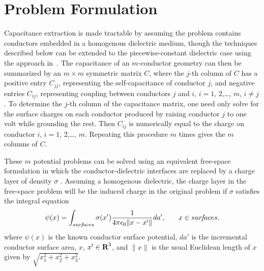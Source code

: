 \section{Problem Formulation}
\label{form}

Capacitance extraction is made tractable by assuming the problem
contains conductors embedded in a homogenous dielectric medium, though
the techniques described below can be extended to the
piecewise-constant dielectric case using the approach in~\cite{rao84}.
The capacitance of an $m$-conductor geometry can then
be summarized by an $m\times m$ symmetric matrix $C$, where the $j$-th
column of $C$ has a positive entry $C_{jj}$, representing the
self-capacitance of conductor $j$, and negative  entries
$C_{ij}$, representing coupling between conductors $j$ and $i$, $i=1$,
2,\ldots, $m$, $i\neq j$.  To determine the $ j $-th column of the
capacitance matrix, one need only solve for the surface charges on
each conductor produced by raising conductor $ j $ to one volt while
grounding the rest.  Then $C_{ij}$ is numerically equal to
the charge on conductor $i$,
$i=1$, 2,\ldots, $m$.  Repeating this procedure $m$ times gives the
$m$ columns of $C$.

These $m$ potential problems can be solved using an equivalent
free-space formulation in which the conductor-dielectric interfaces
are replaced by a charge layer of density $\sigma$
\cite{ruehli73,rao84}.  Assuming a homogenous dielectric, the
charge layer in the free-space problem will be the induced charge in
the original problem if $ \sigma $ satisfies the integral equation
\begin{equation}
\psi(x)=\int_{  sur\!f\!aces } \sigma (x')\frac{1}{4\pi\epsilon_0\| x - x' \| } da',\rule{0.25in}{0in}x\in sur\!f\!aces.
\label{eq:integral}
\end{equation}
where $ \psi(x) $ is the known conductor surface potential, 
$da'$ is the incremental conductor surface area,
$ x$, $x' \in \mbox{\bf R}^3 $, 
and $ \| x \| $ is the usual Euclidean length of $x $ given by
$ \sqrt{x_1^2 + x_2^2 + x_3^2} $. 

